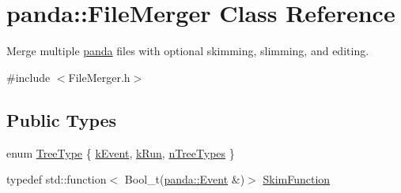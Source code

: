 \hypertarget{classpanda_1_1FileMerger}{
\section{panda::FileMerger Class Reference}
\label{classpanda_1_1FileMerger}
}


Merge multiple \hyperlink{namespacepanda}{panda} files with optional skimming, slimming, and editing.  


{\ttfamily \#include $<$FileMerger.h$>$}\subsection*{Public Types}
\begin{DoxyCompactItemize}
\item 
enum \hyperlink{classpanda_1_1FileMerger_ae2c288ef71fbf209d48b144eb8b1eecf}{TreeType} \{ \hyperlink{classpanda_1_1FileMerger_ae2c288ef71fbf209d48b144eb8b1eecfa502ed3ad80a4dd3c11f4af925961a08e}{kEvent}, 
\hyperlink{classpanda_1_1FileMerger_ae2c288ef71fbf209d48b144eb8b1eecfae9f2c0075bb55d1614462922e1847f78}{kRun}, 
\hyperlink{classpanda_1_1FileMerger_ae2c288ef71fbf209d48b144eb8b1eecfa9f24d581a9e206c72be83065ef76e6fa}{nTreeTypes}
 \}
\item 
typedef std::function$<$ Bool\_\-t(\hyperlink{classpanda_1_1Event}{panda::Event} \&)$>$ \hyperlink{classpanda_1_1FileMerger_a391f31b244a3c8defe8e5fed131e0140}{SkimFunction}
\end{DoxyCompactItemize}
